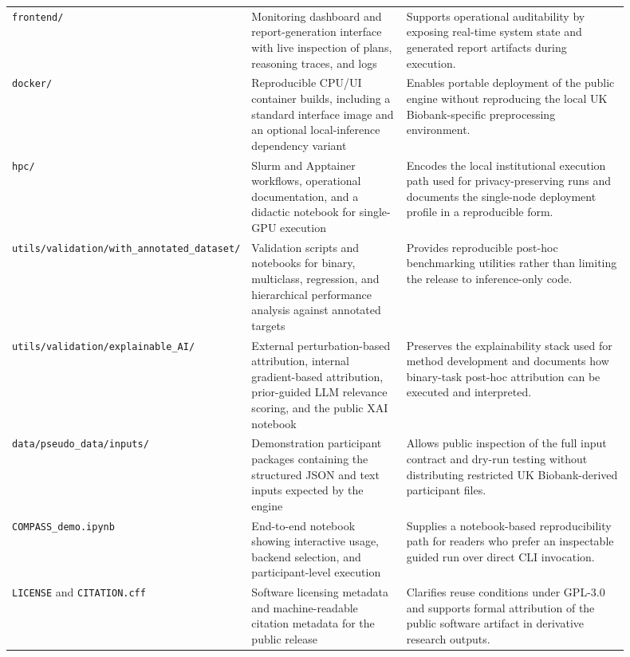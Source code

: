 \documentclass[11pt,a4paper,twoside]{article}
\begin{document}
\begin{longtable}{p{0.20\linewidth} p{0.28\linewidth} p{0.42\linewidth}}
\texttt{frontend/} & Monitoring dashboard and report-generation interface with live inspection of plans, reasoning traces, and logs & Supports operational auditability by exposing real-time system state and generated report artifacts during execution. \\
\texttt{docker/} & Reproducible CPU/UI container builds, including a standard interface image and an optional local-inference dependency variant & Enables portable deployment of the public engine without reproducing the local UK Biobank-specific preprocessing environment. \\
\texttt{hpc/} & Slurm and Apptainer workflows, operational documentation, and a didactic notebook for single-GPU execution & Encodes the local institutional execution path used for privacy-preserving runs and documents the single-node deployment profile in a reproducible form. \\
\nolinkurl{utils/validation/with_annotated_dataset/} & Validation scripts and notebooks for binary, multiclass, regression, and hierarchical performance analysis against annotated targets & Provides reproducible post-hoc benchmarking utilities rather than limiting the release to inference-only code. \\
\nolinkurl{utils/validation/explainable_AI/} & External perturbation-based attribution, internal gradient-based attribution, prior-guided LLM relevance scoring, and the public XAI notebook & Preserves the explainability stack used for method development and documents how binary-task post-hoc attribution can be executed and interpreted. \\
\nolinkurl{data/pseudo_data/inputs/} & Demonstration participant packages containing the structured JSON and text inputs expected by the engine & Allows public inspection of the full input contract and dry-run testing without distributing restricted UK Biobank-derived participant files. \\
\nolinkurl{COMPASS_demo.ipynb} & End-to-end notebook showing interactive usage, backend selection, and participant-level execution & Supplies a notebook-based reproducibility path for readers who prefer an inspectable guided run over direct CLI invocation. \\
\texttt{LICENSE} and \texttt{CITATION.cff} & Software licensing metadata and machine-readable citation metadata for the public release & Clarifies reuse conditions under GPL-3.0 and supports formal attribution of the public software artifact in derivative research outputs. \\
\end{longtable}
\end{document}
